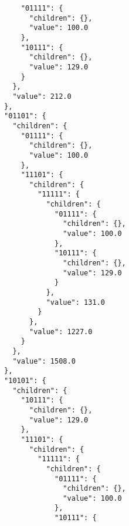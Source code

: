 \documentclass{article}
\begin{document}
\begin{listing}
\begin{verbatim}
                                    "01111": {
                                      "children": {},
                                      "value": 100.0
                                    },
                                    "10111": {
                                      "children": {},
                                      "value": 129.0
                                    }
                                  },
                                  "value": 212.0
                                },
                                "01101": {
                                  "children": {
                                    "01111": {
                                      "children": {},
                                      "value": 100.0
                                    },
                                    "11101": {
                                      "children": {
                                        "11111": {
                                          "children": {
                                            "01111": {
                                              "children": {},
                                              "value": 100.0
                                            },
                                            "10111": {
                                              "children": {},
                                              "value": 129.0
                                            }
                                          },
                                          "value": 131.0
                                        }
                                      },
                                      "value": 1227.0
                                    }
                                  },
                                  "value": 1508.0
                                },
                                "10101": {
                                  "children": {
                                    "10111": {
                                      "children": {},
                                      "value": 129.0
                                    },
                                    "11101": {
                                      "children": {
                                        "11111": {
                                          "children": {
                                            "01111": {
                                              "children": {},
                                              "value": 100.0
                                            },
                                            "10111": {

\end{verbatim}
\end{listing}
\end{document}
